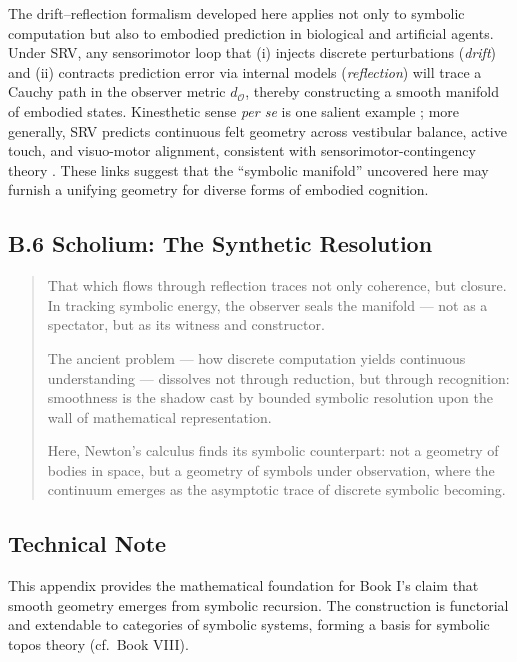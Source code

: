 \begin{remark}
\label{remark:bkB_embodied_predictive_geometry}
The drift--reflection formalism developed here applies not only to symbolic
computation but also to embodied prediction in biological and artificial
agents.  Under SRV, any sensorimotor loop that (i) injects discrete
perturbations (\textit{drift}) and (ii) contracts prediction error via
internal models (\textit{reflection}) will trace a Cauchy path in the
observer metric $d_{\mathcal{O}}$, thereby constructing a smooth manifold of
embodied states.  Kinesthetic sense \emph{per se} is one salient example
\cite{wolpert1998,friston2010}; more generally, SRV predicts
continuous felt geometry across vestibular balance, active touch, and
visuo-motor alignment, consistent with sensorimotor-contingency theory
\cite{oregan2001}.  These links suggest that the “symbolic
manifold” uncovered here may furnish a unifying geometry for diverse forms
of embodied cognition.
\end{remark}

\subsection*{B.6 Scholium: The Synthetic Resolution}
\label{scholium:appB_synthetic_resolution}

\begin{quote}
That which flows through reflection traces not only coherence, but closure.  
In tracking symbolic energy, the observer seals the manifold —  
not as a spectator, but as its witness and constructor.  
  
The ancient problem — how discrete computation yields continuous understanding —  
dissolves not through reduction, but through recognition:  
smoothness is the shadow cast by bounded symbolic resolution  
upon the wall of mathematical representation.  
  
Here, Newton's calculus finds its symbolic counterpart:  
not a geometry of bodies in space,  
but a geometry of symbols under observation,  
where the continuum emerges  
as the asymptotic trace of discrete symbolic becoming.
\end{quote}

\subsection*{Technical Note}
\label{subsec:appB_technical_note}
This appendix provides the mathematical foundation for Book I’s claim that smooth geometry emerges from symbolic recursion. The construction is functorial and extendable to categories of symbolic systems, forming a basis for symbolic topos theory (cf.~Book VIII).
